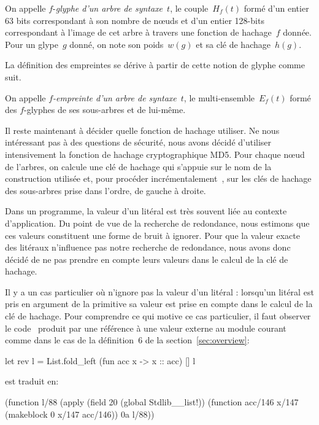 \begin{defn}
On appelle $f$-\textit{glyphe d'un arbre de syntaxe}~$t$, le
couple~$H_f(t)$ formé d'un entier 63 bits correspondant à son nombre
de n{\oe}uds et d'un entier 128-bits correspondant à l'image de cet
arbre à travers une fonction de hachage~$f$ donnée. Pour un glype~$g$
donné, on note son poids~$w(g)$ et sa clé de hachage~$h(g)$.
\end{defn}

La définition des empreintes se dérive à partir de cette notion de glyphe
comme suit.

\begin{defn}
On appelle \textit{$f$-empreinte d'un arbre de syntaxe}~$t$, le
multi-ensemble~$E_f(t)$ formé des $f$-glyphes de ses sous-arbres
et de lui-même.
\end{defn}

Il reste maintenant à décider quelle fonction de hachage utiliser. Ne
nous intéressant pas à des questions de sécurité, nous avons décidé
d'utiliser intensivement la fonction de hachage cryptographique
MD5. Pour chaque n{\oe}ud de l'arbres, on calcule une clé de hachage
qui s'appuie sur le nom de la construction utilisée et, pour procéder
incrémentalement~\cite{DBLP:conf/ml/FilliatreC06}, sur les clés de
hachage des sous-arbres prise dans l'ordre, de gauche à droite.

Dans un programme, la valeur d'un litéral est très souvent liée au
contexte d'application. Du point de vue de la recherche de redondance, nous
estimons que ces valeurs constituent une forme de bruit à ignorer.
Pour que la valeur exacte des litéraux n'influence pas notre recherche
de redondance, nous avons donc décidé de ne pas prendre en compte leurs
valeurs dans le calcul de la clé de hachage.

Il y a un cas particulier où {\Asak} n'ignore pas la valeur d'un
litéral : lorsqu'un litéral est pris en argument de la primitive
 sa valeur est prise en compte dans le calcul de la
clé de hachage. Pour comprendre ce qui motive ce cas particulier, il
faut observer le code~{\LambdaCode} produit par une référence à une
valeur externe au module courant comme dans le cas de la définition~$6$
de la section~\ref{sec:overview}:

\begin{ocaml}
let rev l =
  List.fold_left (fun acc x -> x :: acc) [] l
\end{ocaml}

\noindent est traduit en:

\begin{ocaml}
(function l/88 (apply (field 20 (global Stdlib__list!))
    (function acc/146 x/147 (makeblock 0 x/147 acc/146)) 0a l/88))
\end{ocaml}

